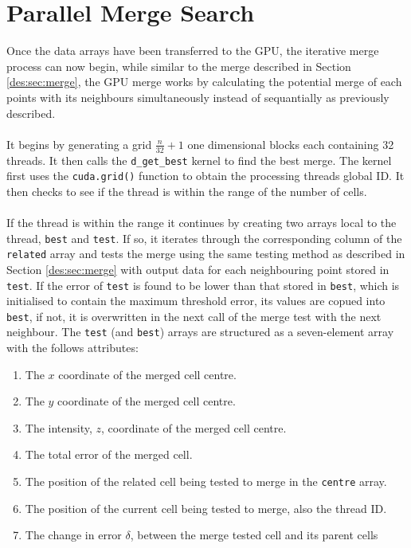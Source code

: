 \section{Parallel Merge Search}
Once the data arrays have been transferred to the GPU, the iterative merge process can now begin, while similar to the merge described in Section \ref{des:sec:merge}, the GPU merge works by calculating the potential merge of each points with its neighbours simultaneously instead of sequantially as previously described.
\\
\\
It begins by generating a grid $\frac{n}{32}+1$ one dimensional blocks each containing 32 threads. It then calls the \texttt{d\_get\_best} kernel to find the best merge. The kernel first uses the \texttt{cuda.grid()} function to obtain the processing threads global ID. It then checks to see if the thread is within the range of the number of cells.
\\
\\
If the thread is within the range it continues by creating two arrays local to the thread, \texttt{best} and \texttt{test}. If so, it iterates through the corresponding column of the \texttt{related} array and tests the merge using the same testing method as described in Section \ref{des:sec:merge} with output data for each neighbouring point stored in \texttt{test}. If the error of \texttt{test} is found to be lower than that stored in \texttt{best}, which is initialised to contain the maximum threshold error, its values are copued into \texttt{best}, if not, it is overwritten in the next call of the merge test with the next neighbour. The \texttt{test} (and \texttt{best}) arrays are structured as a seven-element array with the follows attributes:
\begin{enumerate}
\item The $x$ coordinate of the merged cell centre.
\item The $y$ coordinate of the merged cell centre.
\item The intensity, $z$, coordinate of the merged cell centre.
\item The total error of the merged cell.
\item The position of the related cell being tested to merge in the \texttt{centre} array.
\item The position of the current cell being tested to merge, also the thread ID.
\item The change in error $\delta$, between the merge tested cell and its parent cells
\end{enumerate}
